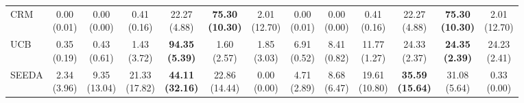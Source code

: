{\begin{tabular}{l|cccccc|cccccc}
CRM & \makecell{0.00 \\ (0.01)} & \makecell{0.00 \\ (0.00)} & \makecell{0.41 \\ (0.16)} & {\cellcolor[HTML]{C8E6C9}} \makecell{22.27 \\ (4.88)} & \bfseries \makecell{75.30 \\ (10.30)} & \makecell{2.01 \\ (12.70)} & \makecell{0.00 \\ (0.01)} & \makecell{0.00 \\ (0.00)} & \makecell{0.41 \\ (0.16)} & {\cellcolor[HTML]{C8E6C9}} \makecell{22.27 \\ (4.88)} & \bfseries \makecell{75.30 \\ (10.30)} & \makecell{2.01 \\ (12.70)} \\
UCB & \makecell{0.35 \\ (0.19)} & \makecell{0.43 \\ (0.61)} & \makecell{1.43 \\ (3.72)} & {\cellcolor[HTML]{C8E6C9}} \bfseries \makecell{94.35 \\ (5.39)} & \makecell{1.60 \\ (2.57)} & \makecell{1.85 \\ (3.03)} & \makecell{6.91 \\ (0.52)} & \makecell{8.41 \\ (0.82)} & \makecell{11.77 \\ (1.27)} & {\cellcolor[HTML]{C8E6C9}} \makecell{24.33 \\ (2.37)} & \bfseries \makecell{24.35 \\ (2.39)} & \makecell{24.23 \\ (2.41)} \\
SEEDA & \makecell{2.34 \\ (3.96)} & \makecell{9.35 \\ (13.04)} & \makecell{21.33 \\ (17.82)} & {\cellcolor[HTML]{C8E6C9}} \bfseries \makecell{44.11 \\ (32.16)} & \makecell{22.86 \\ (14.44)} & \makecell{0.00 \\ (0.00)} & \makecell{4.71 \\ (2.89)} & \makecell{8.68 \\ (6.47)} & \makecell{19.61 \\ (10.80)} & {\cellcolor[HTML]{C8E6C9}} \bfseries \makecell{35.59 \\ (15.64)} & \makecell{31.08 \\ (5.64)} & \makecell{0.33 \\ (0.00)} \\

\end{tabular}}
